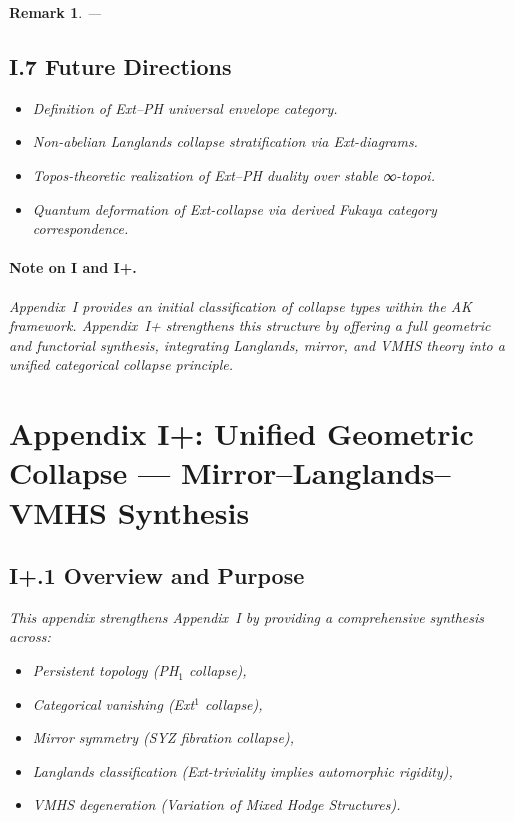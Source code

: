 \documentclass[11pt]{article}
\newtheorem{remark}[theorem]{Remark}
\begin{document}
\begin{remark}
---

\subsection*{I.7 Future Directions}

\begin{itemize}
  \item Definition of Ext–PH universal envelope category.
  \item Non-abelian Langlands collapse stratification via Ext-diagrams.
  \item Topos-theoretic realization of Ext–PH duality over stable ∞-topoi.
  \item Quantum deformation of Ext-collapse via derived Fukaya category correspondence.
\end{itemize}

\paragraph{Note on I and I+.}
Appendix~I provides an initial classification of collapse types within the AK framework.  
Appendix~I+ strengthens this structure by offering a full geometric and functorial synthesis, integrating Langlands, mirror, and VMHS theory into a unified categorical collapse principle.



\section*{Appendix I+: Unified Geometric Collapse — Mirror–Langlands–VMHS Synthesis}

\subsection*{I+.1 Overview and Purpose}

This appendix strengthens Appendix~I by providing a comprehensive synthesis across:
\begin{itemize}
  \item Persistent topology (PH$_1$ collapse),
  \item Categorical vanishing (Ext$^1$ collapse),
  \item Mirror symmetry (SYZ fibration collapse),
  \item Langlands classification (Ext-triviality implies automorphic rigidity),
  \item VMHS degeneration (Variation of Mixed Hodge Structures).
\end{itemize}


\end{remark}
\end{document}
